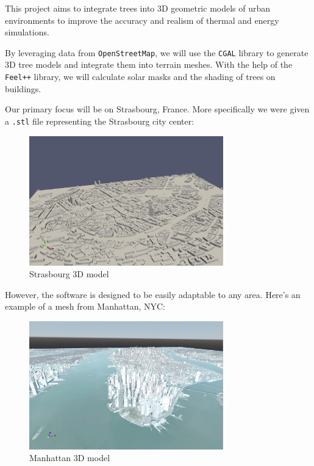 \documentclass[12pt]{article}
\begin{document}
This project aims to integrate trees into 3D geometric models of urban
environments to improve the accuracy and realism of thermal and energy
simulations.

By leveraging data from \texttt{OpenStreetMap}\cite{openstreetmap}, we will use the
\texttt{CGAL}\cite{cgal} library to generate 3D tree models and integrate them into terrain
meshes.
With the help of the \texttt{Feel++}\cite{feel++} library, we will calculate solar masks and
the shading of trees on buildings.

Our primary focus will be on Strasbourg, France. More specifically we were given a
\texttt{.stl}\cite{stl_format} file representing the Strasbourg city center:

\begin{figure}[H]
    \centering
    \includegraphics[width=0.75\textwidth]{images/stras_mesh.png}
    \caption{Strasbourg 3D model}
\end{figure}

However, the software is designed to be easily adaptable to any area.
Here's an example of a mesh from Manhattan, NYC:

\begin{figure}[H]
    \centering
    \includegraphics[width=0.75\textwidth]{images/manhattan_mesh.png}
    \caption{Manhattan 3D model}
\end{figure}
\end{document}
